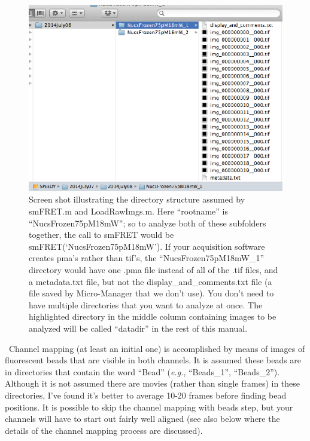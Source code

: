 \documentclass[11pt]{article}
\begin{document}
\begin{figure}[!t]
\begin{center}
\includegraphics[width=4.5in]{ScreenShots/DirectoriesShot.eps}
\caption{Screen shot illustrating the directory structure assumed by smFRET.m and LoadRawImgs.m.  Here ``rootname'' is ``NucsFrozen75pM18mW''; so to analyze both of these subfolders together, the call to smFRET would be smFRET(`NucsFrozen75pM18mW').  If your acquisition software creates pma's rather than tif's, the ``NucsFrozen75pM18mW\_1'' directory would have one .pma file instead of all of the .tif files, and a metadata.txt file, but not the display\_and\_comments.txt file (a file saved by Micro-Manager that we don't use).  You don't need to have multiple directories that you want to analyze at once. The highlighted directory in the middle column containing images to be analyzed will be called ``datadir'' in the rest of this manual.}
\label{fig:DirectoryStructure}
\end{center}
\end{figure}

\noindent \textbullet~Channel mapping (at least an initial one) is accomplished by means of images of fluorescent beads that are visible in both channels. It is assumed these beads are in directories that contain the word ``Bead'' ({\it e.g.}, ``Beads\_1'', ``Beads\_2''). Although it is not assumed there are movies (rather than single frames) in these directories, I've found it's better to average 10-20 frames before finding bead positions.  It is possible to skip the channel mapping with beads step, but your channels will have to start out fairly well aligned (see also below where the details of the channel mapping process are discussed).\\
\end{document}
